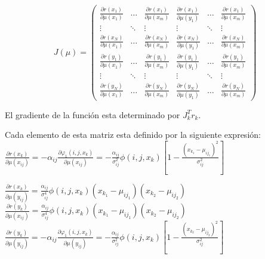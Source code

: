 \documentclass[10pt,journal,compsoc]{styles/IEEEtran}
\begin{document}
\[J(\mu)= \left( \begin{array}{cccccc}
\frac{\partial r(x_1)}{\partial \mu(x_1)} & \ldots & \frac{\partial r(x_1)}{\partial \mu(x_m)} & \frac{\partial r(x_1)}{\partial \mu(y_1)} & \ldots & \frac{\partial r(x_1)}{\partial \mu(x_m)} \\
\vdots & \ddots & \vdots & \vdots & \ddots & \vdots \\

\frac{\partial r(x_N)}{\partial \mu(x_1)} & \ldots & \frac{\partial r(x_N)}{\partial \mu(x_m)} & \frac{\partial r(x_N)}{\partial \mu(y_1)} & \ldots & \frac{\partial r(x_N)}{\partial \mu(x_m)} \\
\frac{\partial r(y_1)}{\partial \mu(x_1)} & \ldots & \frac{\partial r(y_1)}{\partial \mu(x_m)} & \frac{\partial r(y_1)}{\partial \mu(y_1)} & \ldots & \frac{\partial r(y_1)}{\partial \mu(x_m)} \\
\vdots & \ddots & \vdots & \vdots & \ddots & \vdots \\

\frac{\partial r(y_N)}{\partial \mu(x_1)} & \ldots & \frac{\partial r(y_N)}{\partial \mu(x_m)} & \frac{\partial r(y_N)}{\partial \mu(y_1)} & \ldots & \frac{\partial r(y_N)}{\partial \mu(x_m)}
\end{array} \right)\] 

El gradiente de la función esta determinado por $J_k^Tr_k$. 

Cada elemento de esta matriz esta definido por la siguiente expresión:\\

\small 
$\frac{\partial r(x_k)}{\partial \mu(x_{ij})}=- \alpha_{ij} \frac{\partial \varphi_1(i,j,x_k)}{\partial \mu(x_{ij})} =- \frac{\alpha_{ij}}{\sigma_{ij}^2}\phi(i,j,x_k)[1-\frac{(x_{k_1}-\mu_{ij_1})^2}{\sigma_{ij}^2}] $\\
\normalsize

$\frac{\partial r(x_k)}{\partial \mu(y_{ij})}= \frac{\alpha_{ij}}{\sigma_{ij}^4}\phi(i,j,x_k)(x_{k_1}-\mu_{ij_1})(x_{k_2}-\mu_{ij_2})$\\

$\frac{\partial r(y_k)}{\partial \mu(x_{ij})}=\frac{\alpha_{ij}}{\sigma_{ij}^4}\phi(i,j,x_k)(x_{k_1}-\mu_{ij_1})(x_{k_2}-\mu_{ij_2})$\\

\small 
$\frac{\partial r(y_k)}{\partial \mu(y_{ij})}=- \alpha_{ij} \frac{\partial \varphi_1(i,j,x_k)}{\partial \mu(y_{ij})} =- \frac{\alpha_{ij}}{\sigma_{ij}^2}\phi(i,j,x_k)[1-\frac{(x_{k_2}-\mu_{ij_2})^2}{\sigma_{ij}^2}] $\\
\normalsize
\end{document}
